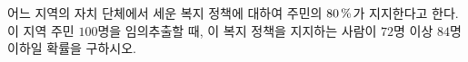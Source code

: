 어느 지역의 자치 단체에서 세운 복지 정책에 대하여 주민의 $80\mkern3mu \%$가 지지한다고 한다. 이 지역 주민 $100$명을 임의추출할 때, 이 복지 정책을 지지하는 사람이 $72$명 이상 $84$명 이하일 확률을 구하시오. 
